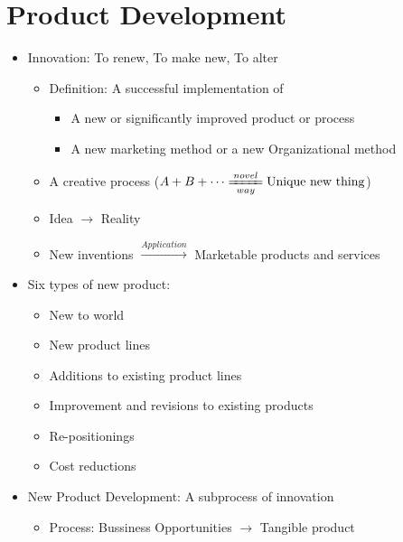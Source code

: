 \documentclass[openany,12pt,a4paper]{book}
\begin{document}
\section{Product Development}
\begin{itemize}
    \item Innovation: To renew, To make new, To alter
    \begin{itemize}
        \item Definition: A successful implementation of
        \begin{itemize}
            \item A new or significantly improved product or process
            \item A new marketing method or a new Organizational method
        \end{itemize}
        \item A creative process ($A + B + \cdots \xlongequal[way]{novel} \text{Unique new thing}$)
        \item Idea $\rightarrow$ Reality
        \item New inventions $\xrightarrow{Application}$ Marketable products and services
    \end{itemize}
    \item Six types of new product:
    \begin{itemize}
        \item New to world
        \item New product lines
        \item Additions to existing product lines
        \item Improvement and revisions to existing products
        \item Re-positionings
        \item Cost reductions
    \end{itemize}
    \item New Product Development: A subprocess of innovation
    \begin{itemize}
        \item Process: Bussiness Opportunities $\rightarrow$ Tangible product
    \end{itemize}
\end{itemize}
\end{document}

